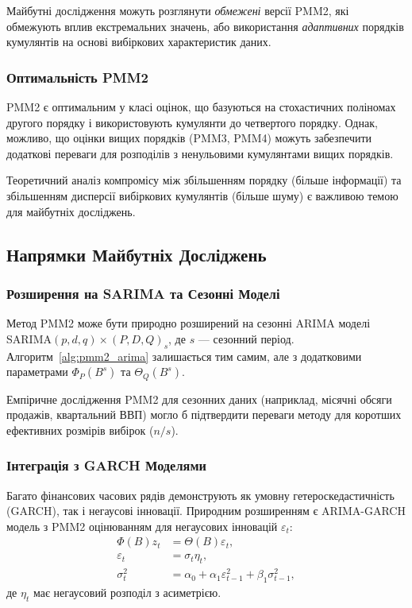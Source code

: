 \documentclass[12pt,a4paper]{article}
\begin{document}
Майбутні дослідження можуть розглянути \textit{обмежені} версії PMM2, які обмежують вплив екстремальних значень, або використання \textit{адаптивних} порядків кумулянтів на основі вибіркових характеристик даних.

\subsubsection{Оптимальність PMM2}

PMM2 є оптимальним у класі оцінок, що базуються на стохастичних поліномах другого порядку і використовують кумулянти до четвертого порядку. Однак, можливо, що оцінки вищих порядків (PMM3, PMM4) можуть забезпечити додаткові переваги для розподілів з ненульовими кумулянтами вищих порядків.

Теоретичний аналіз компромісу між збільшенням порядку (більше інформації) та збільшенням дисперсії вибіркових кумулянтів (більше шуму) є важливою темою для майбутніх досліджень.

\subsection{Напрямки Майбутніх Досліджень}
\label{subsec:future_research}

\subsubsection{Розширення на SARIMA та Сезонні Моделі}

Метод PMM2 може бути природно розширений на сезонні ARIMA моделі SARIMA$(p,d,q) \times (P,D,Q)_s$, де $s$ --- сезонний період. Алгоритм~\ref{alg:pmm2_arima} залишається тим самим, але з додатковими параметрами $\Phi_P(B^s)$ та $\Theta_Q(B^s)$.

Емпіричне дослідження PMM2 для сезонних даних (наприклад, місячні обсяги продажів, квартальний ВВП) могло б підтвердити переваги методу для коротших ефективних розмірів вибірок ($n / s$).

\subsubsection{Інтеграція з GARCH Моделями}

Багато фінансових часових рядів демонструють як умовну гетероскедастичність (GARCH), так і негаусові інновації. Природним розширенням є ARIMA-GARCH модель з PMM2 оцінюванням для негаусових інновацій $\varepsilon_t$:
\begin{align}
    \Phi(B) z_t &= \Theta(B) \varepsilon_t, \\
    \varepsilon_t &= \sigma_t \eta_t, \\
    \sigma_t^2 &= \alpha_0 + \alpha_1 \varepsilon_{t-1}^2 + \beta_1 \sigma_{t-1}^2,
\end{align}
де $\eta_t$ має негаусовий розподіл з асиметрією.
\end{document}
